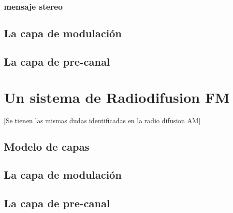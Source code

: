 \subsubsection{mensaje stereo}
\subsection{La capa de modulación}
\subsection{La capa de pre-canal}


\section{Un sistema de Radiodifusion FM}
[Se tienen las mismas dudas identificadas en la radio difusion AM]
\subsection{Modelo de capas}
\subsection{La capa de modulación}
\subsection{La capa de pre-canal}

